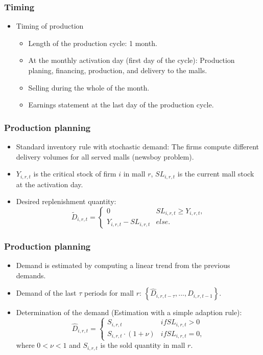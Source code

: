 \documentclass{beamer}
\begin{document}
\frame
{
  \frametitle{Timing} 
  
  \begin{itemize}	
	\item Timing of production
	
\begin{itemize}
	\item Length of the production cycle: 1 month. 
	\item At the monthly activation day (first day of the cycle): Production planing, financing, production, and delivery to the malls.
	\item Selling during the whole of the month.
	\item Earnings statement at the last day of the production cycle.
\end{itemize}
\end{itemize}


}


\frame
{
  \frametitle{Production planning} 
\begin{itemize}
	\item Standard inventory rule with stochastic demand: The firms compute different delivery volumes for all served malls (newsboy problem).
	
	\item $Y_{i,r,t}$ is the critical stock of firm $i$ in mall $r$, $SL_{i,r,t}$ is the current mall stock at the activation day.
		
	\item Desired replenishment quantity:
	\[
			\tilde{D}_{i,r,t}= \begin{cases} 0 & SL_{i,r,t}\geq Y_{i,r,t},\\
																			Y_{i,r,t} -  SL_{i,r,t} &else. 
			
			 \end{cases}
	\]
	
	
	\end{itemize}


}

\frame
{

  \frametitle{Production planning} 
\begin{itemize}

\item Demand is estimated by computing a linear trend from the previous demands.

\item Demand of the last $\tau$ periods for mall $r$: $\left\{ \hat{D}_{i,r,t-\tau},...,\hat{D}_{i,r,t-1} \right\}$.

\item Determination of the demand (Estimation with a simple adaption rule):  
		\[
				\hat{D}_{i,r,t}=\begin{cases}  S_{i,r,t} & if SL_{i,r,t}>0 \\ S_{i,r,t}\cdot (1+ \nu) & if SL_{i,r,t}=0, \end{cases}
		\]
		where $0 < \nu < 1$ and $S_{i,r,t}$ is the sold quantity in mall $r$.
\end{itemize}
  
}
\end{document}
